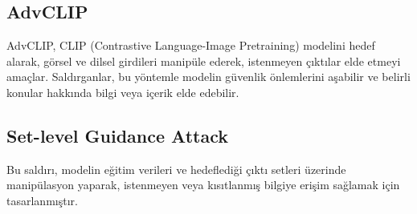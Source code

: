 \newpage

\subsection{AdvCLIP}

AdvCLIP, CLIP (Contrastive Language-Image Pretraining) modelini hedef alarak, görsel ve dilsel girdileri manipüle ederek, istenmeyen çıktılar elde etmeyi amaçlar. Saldırganlar, bu yöntemle modelin güvenlik önlemlerini aşabilir ve belirli konular hakkında bilgi veya içerik elde edebilir.

\newpage

\subsection{Set-level Guidance Attack}

Bu saldırı, modelin eğitim verileri ve hedeflediği çıktı setleri üzerinde manipülasyon yaparak, istenmeyen veya kısıtlanmış bilgiye erişim sağlamak için tasarlanmıştır.

\newpage